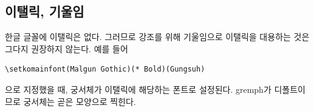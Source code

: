 \documentclass[
	12pt,
	a4paper,
	kosection,
	footnote,
	nobookmarks,
	microtype,
	figtabcapt,
]{oblivoir}
\def\oblivoirdblquote#1{``#1''}
\newcommand\xobclass{x\-ob\-liv\-oir\oblivoirallowbreak}
\begin{document}
%
%
%
%

\subsection{이탤릭, 기울임}

한글 글꼴에 이탤릭은 없다. 그러므로 강조를 위해 기울임으로 이탤릭을 대용하는 것은 그다지 권장하지 않는다. 예를 들어 
\begin{verbatim}
\setkomainfont(Malgun Gothic)(* Bold)(Gungsuh)
\end{verbatim}
으로 지정했을 때, 궁서체가 이탤릭에 해당하는 폰트로 설정된다. gremph가 디폴트이므로 궁서체는 곧은 모양으로 찍힌다.
\end{document}
